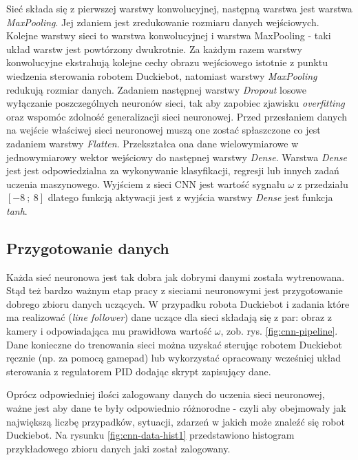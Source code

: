 \documentclass[conference]{IEEEtran}
\begin{document}
Sieć składa się z pierwszej warstwy konwolucyjnej, następną warstwa jest warstwa \emph{MaxPooling}. Jej zdaniem jest zredukowanie rozmiaru danych wejściowych. Kolejne  warstwy sieci to warstwa konwolucyjnej i warstwa MaxPooling - taki układ warstw jest powtórzony dwukrotnie. Za każdym razem warstwy konwolucyjne ekstrahują kolejne cechy obrazu wejściowego istotnie z punktu wiedzenia sterowania robotem Duckiebot, natomiast warstwy \emph{MaxPooling} redukują rozmiar danych. Zadaniem następnej warstwy \emph{Dropout} losowe wyłączanie poszczególnych neuronów sieci, tak aby zapobiec zjawisku \emph{overfitting} oraz wspomóc zdolność generalizacji sieci neuronowej. Przed przesłaniem danych na wejście właściwej sieci neuronowej muszą one zostać spłaszczone co jest zadaniem warstwy \emph{Flatten}. Przekształca ona dane wielowymiarowe w jednowymiarowy wektor wejściowy do następnej warstwy \emph{Dense}. Warstwa \emph{Dense} jest jest odpowiedzialna za wykonywanie klasyfikacji, regresji lub innych zadań uczenia maszynowego. Wyjściem z sieci CNN jest wartość sygnału $\omega$ z przedziału $[-8\: ; \:8]$ dlatego funkcją aktywacji jest z wyjścia warstwy \emph{Dense} jest funkcja \emph{tanh}.

\subsection{Przygotowanie danych}
Każda sieć neuronowa jest tak dobra jak dobrymi danymi została wytrenowana. Stąd też bardzo ważnym etap pracy z sieciami neuronowymi jest przygotowanie dobrego zbioru danych uczących. W przypadku robota Duckiebot i zadania które ma realizować (\emph{line follower}) dane uczące dla sieci składają się z par: obraz z kamery i odpowiadająca mu prawidłowa wartość $\omega$, zob. rys. \ref{fig:cnn-pipeline}. Dane konieczne do trenowania sieci można uzyskać sterując robotem Duckiebot ręcznie (np. za pomocą gamepad) lub wykorzystać opracowany wcześniej układ sterowania z regulatorem PID dodając skrypt zapisujący dane. 

Oprócz odpowiedniej ilości zalogowany danych do uczenia sieci neuronowej, ważne jest aby dane te były odpowiednio różnorodne - czyli aby obejmowały jak największą liczbę przypadków, sytuacji, zdarzeń w jakich może znaleźć się robot Duckiebot. Na rysunku \ref{fig:cnn-data-hist1} przedstawiono histogram przykładowego zbioru danych jaki został zalogowany. 
\end{document}
